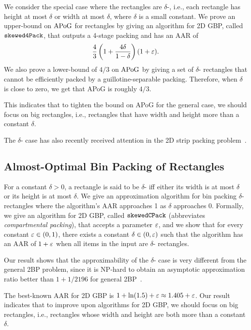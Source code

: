 We consider the special case where the rectangles are $\delta$-\thin,
i.e., each rectangle has height at most $\delta$ or width at most $\delta$,
where $\delta$ is a small constant.
We prove an upper-bound on $\mathrm{APoG}$ for \thin{} rectangles by
giving an algorithm for 2D GBP, called $\operatorname{\mathtt{skewed4Pack}}$,
that outputs a 4-stage packing and has an AAR of
\[ \frac{4}{3}\left(1+\frac{4\delta}{1-\delta}\right)(1+\varepsilon). \]
We also prove a lower-bound of $4/3$ on $\mathrm{APoG}$ by giving
a set of $\delta$-\thin{} rectangles that cannot be efficiently
packed by a guillotine-separable packing.
Therefore, when $\delta$ is close to zero, we get that APoG is roughly $4/3$.

This indicates that to tighten the bound on APoG for the general case,
we should focus on big rectangles, i.e., rectangles that have width and height
more than a constant $\delta$.

The $\delta$-\thin{} case has also recently received attention in
the 2D strip packing problem~\cite{galvez2020tight}.

\subsection{Almost-Optimal Bin Packing of \Thin{} Rectangles}

\newcommand{\thinBPIntro}{
For a constant $\delta > 0$, a rectangle is said to be $\delta$-\thin{}
iff either its width is at most $\delta$ or its height is at most $\delta$.
We give an approximation algorithm for bin packing $\delta$-\thin{} rectangles
where the algorithm's AAR approaches 1 as $\delta$ approaches 0.
Formally, we give an algorithm for 2D GBP, called $\thinCPack$
(abbreviates \emph{\thin{} compartmental packing}),
that accepts a parameter $\eps$, and we show that for every constant $\eps \in (0, 1)$,
there exists a constant $\delta \in (0, \eps)$ such that the algorithm has an AAR of $1+\eps$
when all items in the input are $\delta$-\thin{} rectangles.

Our result shows that the approximability of the $\delta$-\thin{} case is very different from
the general 2BP problem, since it is NP-hard to obtain
an asymptotic approximation ratio better than
$1 + 1/2196$ for general 2BP~\cite{chlebik2009hardness}.

The best-known AAR for 2D GBP is $1 + \ln(1.5) + \eps \approx 1.405 + \eps$.
Our result indicates that to improve upon algorithms for 2D GBP,
we should focus on big rectangles, i.e., rectangles whose
width and height are both more than a constant $\delta$.%
}
\thinBPIntro

